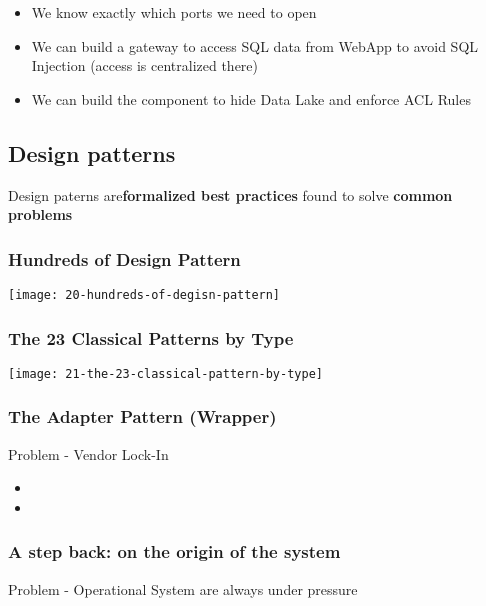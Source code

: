 \begin{itemize}
	\item We know exactly which ports we need to open
	\item We can build a gateway to access SQL data from WebApp to avoid SQL Injection (access is centralized there)
	\item We can build the component to hide Data Lake and enforce ACL Rules
\end{itemize}

\subsection{Design patterns}
Design paterns are\textbf{formalized best practices} found to solve \textbf{common problems}

\subsubsection{Hundreds of Design Pattern}
\begin{center}
\texttt{[image: 20-hundreds-of-degisn-pattern]}
\end{center}

\subsubsection{The 23 Classical Patterns by Type}
\begin{center}
\texttt{[image: 21-the-23-classical-pattern-by-type]}
\end{center}

\subsubsection{The Adapter Pattern (Wrapper)}

Problem - Vendor Lock-In

\begin{center}
\end{center}

\begin{itemize}
	\item
	\item
\end{itemize}

\subsubsection{A step back: on the origin of the system}
Problem - Operational System are always under pressure

